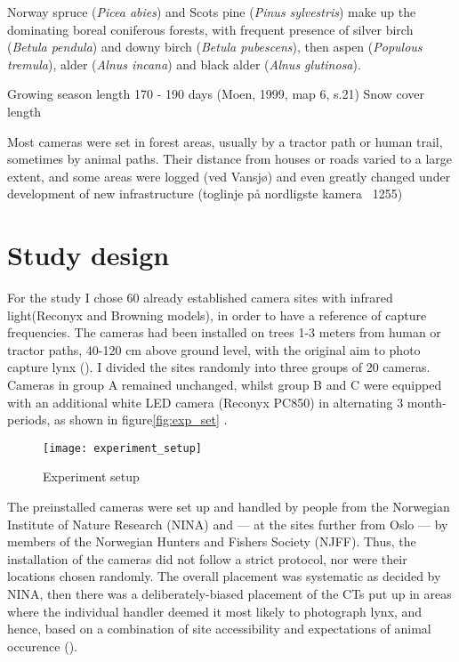 Norway spruce (\textit{Picea abies}) and Scots pine (\textit{Pinus sylvestris}) make up the dominating boreal coniferous forests, with frequent presence of silver birch (\textit{Betula pendula}) and downy birch (\textit{Betula pubescens}), then aspen (\textit{Populous tremula}), alder (\textit{Alnus incana}) and black alder (\textit{Alnus glutinosa}).

Growing season length 170 - 190 days (Moen, 1999, map 6, s.21) %
Snow cover length												%

Most cameras were set in forest areas, usually by a tractor path or human trail, sometimes by animal paths. Their distance from houses or roads varied to a large extent, and some areas were logged (ved Vansjø) and even greatly changed under development of new infrastructure (toglinje på nordligste kamera ~1255)


\section{Study design} %
For the study I chose 60 already established camera sites with infrared light(Reconyx and Browning models), in order to have a reference of capture frequencies. The cameras had been installed on trees 1-3 meters from human or tractor paths, 40-120 cm above ground level, with the original aim to photo capture lynx (\cite{Odden2015}). 
I divided the sites randomly into three groups of 20 cameras. Cameras in group A remained unchanged, whilst group B and C were equipped with an additional white LED camera (Reconyx PC850) in alternating 3 month-periods, as shown in figure\vref{fig:exp_set} .
\begin{figure}
    \begin{center}
    	\texttt{[image: experiment\_setup]} %
    \end{center}
    	\caption{Experiment setup}
    \label{fig:exp_set}
\end{figure}


The preinstalled cameras were set up and handled by people from the Norwegian Institute of Nature Research (NINA) and --- at the sites further from Oslo  --- by members of the Norwegian Hunters and Fishers Society (NJFF). 
Thus, the installation of the cameras did not follow a strict protocol, nor were their locations chosen randomly. The overall placement was systematic as decided by NINA, then there was a deliberately-biased placement of the CTs put up in areas where the individual handler deemed it most likely to photograph lynx,
and hence, based on a combination of site accessibility and expectations of animal occurence (\cite{Burton2015}). %

